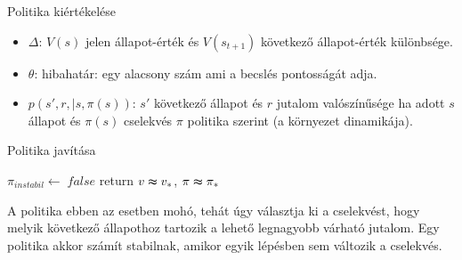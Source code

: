\documentclass[english, aspectratio=169]{beamer}
\begin{document}
\begin{frame}
\begin{algorithm}[H]
\caption{Politika kiértékelése}
\SetAlgoLined
\end{algorithm}
\begin{itemize}
	\item $\Delta$: $V(s)$ jelen állapot-érték és $V(s_{t+1})$ következő állapot-érték különbsége.
	\item $\theta$: hibahatár: egy alacsony szám ami a becslés pontosságát adja.
	\item $p\left(s',r,|s,\pi(s)\right)$: $s'$ következő állapot és $r$ jutalom valószínűsége ha adott $s$ állapot és $\pi(s)$ cselekvés $\pi$ politika szerint (a környezet dinamikája).
\end{itemize}
\end{frame}

\begin{frame}
\begin{algorithm}[H]
\caption{Politika javítása}
\SetAlgoLined
	$\pi_{instabil} \leftarrow\; false$
	return $v \thickapprox v_{*}$, $\pi \thickapprox \pi_{*}$
\end{algorithm}
A politika ebben az esetben mohó, tehát úgy választja ki a cselekvést, hogy melyik következő állapothoz tartozik a lehető legnagyobb várható jutalom. Egy politika akkor számít stabilnak, amikor egyik lépésben sem változik a cselekvés. 
\end{frame}
\end{document}
